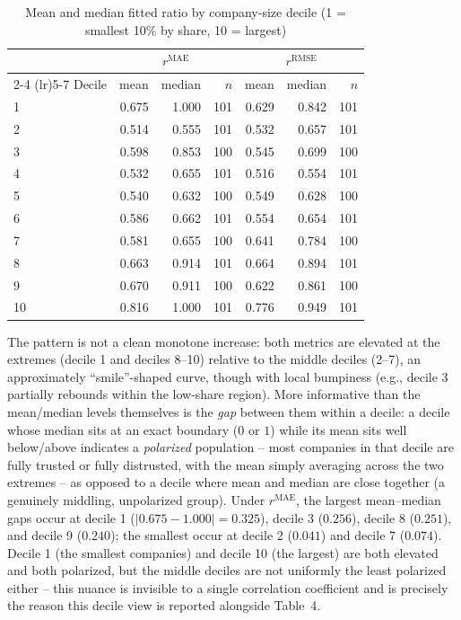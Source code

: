 \documentclass[11pt]{article}
\newcommand{\rmae}{r^{\text{MAE}}}
\newcommand{\rrmse}{r^{\text{RMSE}}}
\begin{document}
\begin{table}[h]
\centering
\caption{Mean and median fitted ratio by company-size decile (1 = smallest 10\% by share, 10 = largest)}
\begin{tabular}{lrrrrrr}
\toprule
& \multicolumn{3}{c}{$\rmae$} & \multicolumn{3}{c}{$\rrmse$} \\
\cmidrule(lr){2-4} \cmidrule(lr){5-7}
Decile & mean & median & $n$ & mean & median & $n$ \\
\midrule
1  & 0.675 & 1.000 & 101 & 0.629 & 0.842 & 101 \\
2  & 0.514 & 0.555 & 101 & 0.532 & 0.657 & 101 \\
3  & 0.598 & 0.853 & 100 & 0.545 & 0.699 & 100 \\
4  & 0.532 & 0.655 & 101 & 0.516 & 0.554 & 101 \\
5  & 0.540 & 0.632 & 100 & 0.549 & 0.628 & 100 \\
6  & 0.586 & 0.662 & 101 & 0.554 & 0.654 & 101 \\
7  & 0.581 & 0.655 & 100 & 0.641 & 0.784 & 100 \\
8  & 0.663 & 0.914 & 101 & 0.664 & 0.894 & 101 \\
9  & 0.670 & 0.911 & 100 & 0.622 & 0.861 & 100 \\
10 & 0.816 & 1.000 & 101 & 0.776 & 0.949 & 101 \\
\bottomrule
\end{tabular}
\end{table}

The pattern is not a clean monotone increase: both metrics are elevated at the extremes (decile 1
and deciles 8--10) relative to the middle deciles (2--7), an approximately ``smile''-shaped curve,
though with local bumpiness (e.g., decile 3 partially rebounds within the low-share region).
More informative than the mean/median levels themselves is the \emph{gap} between them within a
decile: a decile whose median sits at an exact boundary ($0$ or $1$) while its mean sits well
below/above indicates a \emph{polarized} population -- most companies in that decile are fully
trusted or fully distrusted, with the mean simply averaging across the two extremes -- as opposed
to a decile where mean and median are close together (a genuinely middling, unpolarized group).
Under $\rmae$, the largest mean--median gaps occur at decile 1 ($|0.675-1.000|=0.325$), decile 3
($0.256$), decile 8 ($0.251$), and decile 9 ($0.240$); the smallest occur at decile 2 ($0.041$)
and decile 7 ($0.074$). Decile 1 (the smallest companies) and decile 10 (the largest) are both
elevated and both polarized, but the middle deciles are not uniformly the least polarized either --
this nuance is invisible to a single correlation coefficient and is precisely the reason this
decile view is reported alongside Table~4.
\end{document}
